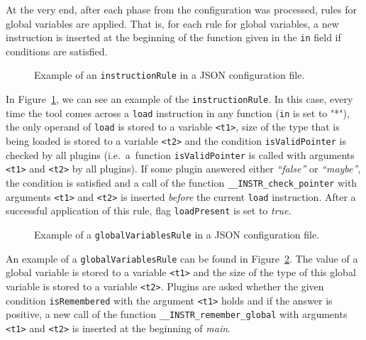 At the very end, after each phase from the configuration was processed, rules
for global variables are applied. That is, for each rule for global variables,
    a new instruction is inserted at the beginning of the function given in the
    \texttt{in} field if conditions are satisfied.


\begin{figure}[t]

\caption{Example of an \texttt{instructionRule} in a JSON configuration file.}
\label{fig:json_example}
\end{figure}

In Figure~\ref{fig:json_example}, we can see an example of the
\texttt{instructionRule}. In this case, every time the tool comes across a
\texttt{load} instruction in any function (\texttt{in} is set to "*"), the only
operand of \texttt{load} is stored to a variable \texttt{<t1>}, size of the
type that is being loaded is stored to a variable \texttt{<t2>} and the condition
\texttt{isValidPointer} is checked by all plugins (i.e.~a~function
\texttt{isValidPointer} is called with arguments \texttt{<t1>} and
\texttt{<t2>} by all plugins). If some plugin answered either \emph{``false''} or
\emph{``maybe''}, the condition is satisfied and a call of the function
\texttt{\_\_INSTR\_check\_pointer} with arguments \texttt{<t1>} and
\texttt{<t2>} is inserted \emph{before} the current \texttt{load} instruction.
After a successful application of this rule, flag \texttt{loadPresent} is set
to \emph{true}.

\begin{figure}[t]

\caption{Example of a \texttt{globalVariablesRule} in a JSON configuration file.}
\label{fig:json_example2}
\end{figure}

An example of a \texttt{globalVariablesRule} can be found in
Figure~\ref{fig:json_example2}. The value of a global variable is stored to a
variable \texttt{<t1>} and the size of the type of this global variable is stored to
a variable \texttt{<t2>}. Plugins are asked whether the given condition
\texttt{isRemembered} with the argument \texttt{<t1>} holds and if the answer is
positive, a new call of the function \texttt{\_\_INSTR\_remember\_global} with
arguments \texttt{<t1>} and \texttt{<t2>} is inserted at the beginning of
\emph{main}.

